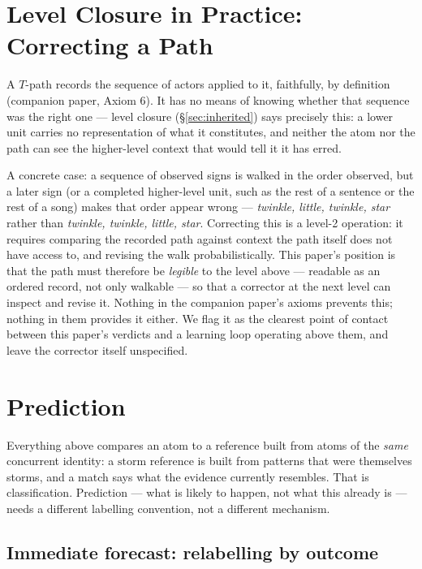 \documentclass[12pt, a4paper]{article}
\begin{document}
\section{Level Closure in Practice: Correcting a Path}
\label{sec:level_closure_practice}

A $T$-path records the sequence of actors applied to it, faithfully,
by definition (companion paper, Axiom 6). It has no means of knowing
whether that sequence was the right one --- level closure
(\S\ref{sec:inherited}) says precisely this: a lower unit carries no
representation of what it constitutes, and neither the atom nor the
path can see the higher-level context that would tell it it has erred.

A concrete case: a sequence of observed signs is walked in the order
observed, but a later sign (or a completed higher-level unit, such as
the rest of a sentence or the rest of a song) makes that order appear
wrong --- \emph{twinkle, little, twinkle, star} rather than
\emph{twinkle, twinkle, little, star}. Correcting this is a level-2
operation: it requires comparing the recorded path against context the
path itself does not have access to, and revising the walk
probabilistically. This paper's position is that the path must
therefore be \emph{legible} to the level above --- readable as an
ordered record, not only walkable --- so that a corrector at the next
level can inspect and revise it. Nothing in the companion paper's
axioms prevents this; nothing in them provides it either. We flag it
as the clearest point of contact between this paper's verdicts and a
learning loop operating above them, and leave the corrector itself
unspecified.

\section{Prediction}
\label{sec:prediction}

Everything above compares an atom to a reference built from atoms of
the \emph{same} concurrent identity: a $\mathrm{storm}$ reference is
built from patterns that were themselves storms, and a match says what
the evidence currently resembles. That is classification. Prediction
--- what is likely to happen, not what this already is --- needs a
different labelling convention, not a different mechanism.

\subsection{Immediate forecast: relabelling by outcome}
\label{subsec:immediate_forecast}
\end{document}
